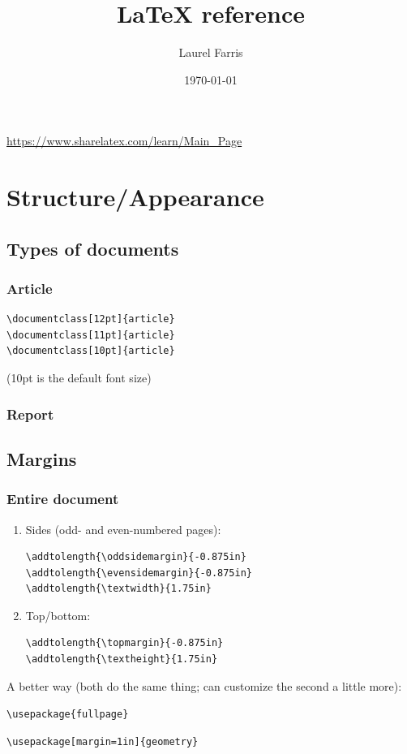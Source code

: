 \documentclass{article}
\title{LaTeX reference}
\author{Laurel Farris}
\date{\today}
\begin{document}
\maketitle
\url{https://www.sharelatex.com/learn/Main_Page}
\tableofcontents
\section{Structure/Appearance}

\subsection{Types of documents}
\subsubsection{Article}
\begin{verbatim}
\documentclass[12pt]{article}
\documentclass[11pt]{article}
\documentclass[10pt]{article}
\end{verbatim}
(10pt is the default font size)
\subsubsection{Report}

\subsection{Margins}
\subsubsection{Entire document}
\begin{enumerate}
    \item Sides (odd- and even-numbered pages):
\begin{verbatim}
\addtolength{\oddsidemargin}{-0.875in}
\addtolength{\evensidemargin}{-0.875in}
\addtolength{\textwidth}{1.75in}
\end{verbatim}
    \item Top/bottom:
\begin{verbatim}
\addtolength{\topmargin}{-0.875in}
\addtolength{\textheight}{1.75in}
\end{verbatim}
\end{enumerate}
A better way (both do the same thing;
can customize the second a little more):
\begin{itemize*}
    \item \verb|\usepackage{fullpage}|
    \item \verb|\usepackage[margin=1in]{geometry}|
\end{itemize*}
\end{document}
